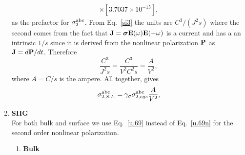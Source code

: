 \documentclass[12pt]{article}
\numberwithin{equation}{section}
\begin{document}
\begin{enumerate}
\begin{align}
\times [3.7037\times 10^{-15}]
,
\end{align}
as the prefactor for $\sigma^{\mathrm{a}\mathrm{b}\mathrm{c}}_2$. From Eq.~\eqref{si3}
the units are $C^3/(J^2s)$ where the second comes from the fact that 
$\mathbf{J}=\boldsymbol{\sigma}\mathbf{E}(\omega)\mathbf{E}(-\omega)$ is a current and has a
an intrinsic $1/s$ since it is derived from the nonlinear polarization
$\mathbf{P}$ as $\mathbf{J}=d\mathbf{P}/dt$. Therefore 
\begin{equation}\label{usigma}
\frac{C^3}{J^2s}=\frac{C^3}{V^2C^2s}=\frac{A}{V^2}
,
\end{equation}
where $A=C/s$ is the ampere.
All together, gives
\begin{equation}\label{c78}
\sigma^{\mathrm{a}\mathrm{b}\mathrm{c}}_{2,S.I.}
=\gamma_\sigma
\sigma^{\mathrm{a}\mathrm{b}\mathrm{c}}_{2,cgs}\frac{A}{V^2}
,
\end{equation}

\item {\bf SHG}\\
For both bulk and surface we use Eq.~\eqref{u.69} instead of
Eq.~\eqref{u.69n} for the second order nonlinear polarization. 
\begin{enumerate}
\item {\bf Bulk}


\end{enumerate}
\end{enumerate}
\end{document}
